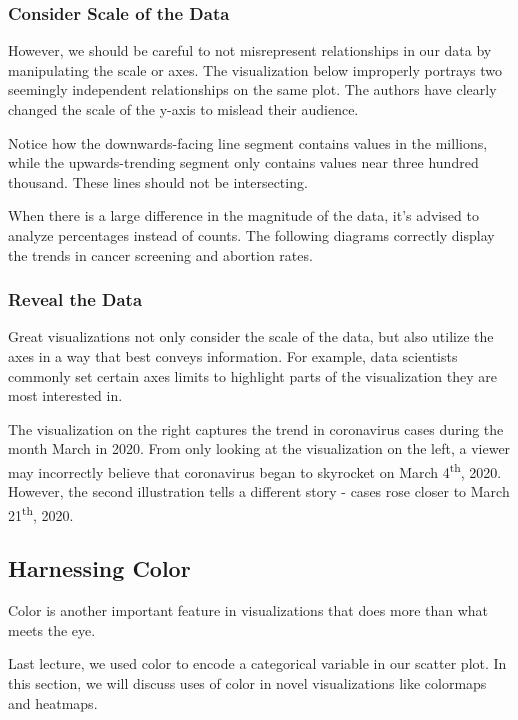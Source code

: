 \documentclass[
  letterpaper,
  DIV=11,
  numbers=noendperiod]{scrreprt}
\begin{document}
\hypertarget{consider-scale-of-the-data}{%
\subsubsection{Consider Scale of the
Data}\label{consider-scale-of-the-data}}

However, we should be careful to not misrepresent relationships in our
data by manipulating the scale or axes. The visualization below
improperly portrays two seemingly independent relationships on the same
plot. The authors have clearly changed the scale of the y-axis to
mislead their audience.

Notice how the downwards-facing line segment contains values in the
millions, while the upwards-trending segment only contains values near
three hundred thousand. These lines should not be intersecting.

When there is a large difference in the magnitude of the data, it's
advised to analyze percentages instead of counts. The following diagrams
correctly display the trends in cancer screening and abortion rates.

\hypertarget{reveal-the-data}{%
\subsubsection{Reveal the Data}\label{reveal-the-data}}

Great visualizations not only consider the scale of the data, but also
utilize the axes in a way that best conveys information. For example,
data scientists commonly set certain axes limits to highlight parts of
the visualization they are most interested in.

The visualization on the right captures the trend in coronavirus cases
during the month March in 2020. From only looking at the visualization
on the left, a viewer may incorrectly believe that coronavirus began to
skyrocket on March 4\textsuperscript{th}, 2020. However, the second
illustration tells a different story - cases rose closer to March
21\textsuperscript{th}, 2020.

\hypertarget{harnessing-color}{%
\subsection{Harnessing Color}\label{harnessing-color}}

Color is another important feature in visualizations that does more than
what meets the eye.

Last lecture, we used color to encode a categorical variable in our
scatter plot. In this section, we will discuss uses of color in novel
visualizations like colormaps and heatmaps.
\end{document}
